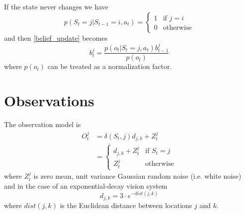 If the state never changes we have
\begin{equation}\label{fixed_target}
  p(S_t = j | S_{t-1} = i, a_t) =
  \begin{cases}
    1 & \text{if $j = i$} \\
    0 & \text{otherwise}
  \end{cases}
\end{equation}
and then \eqref{belief_update} becomes
\begin{equation}\label{belief_update_fixed}
  b_t^j = \frac{ p(o_t | S_t = j, a_t) b_{t-1}^j }{ p(o_t) }
\end{equation}
where $p(o_t)$ can be treated as a normalization factor.

\section{Observations}
The observation model is
\begin{equation}\label{app:ObservationModel}
  \begin{split}
    O_t^j &= \delta (S_t, j) d_{j,k} + Z_t^j \\
          &= \begin{cases}
                d_{j,k} + Z_t^j & \text{if $S_t = j$}\\
                Z_t^j           & \text{otherwise}
             \end{cases}
  \end{split}
\end{equation}
where $Z_t^j$ is zero mean, unit variance Gaussian random noise (i.e. white noise) and in the case of an exponential-decay vision system 
\begin{equation}
  d_{j,k} = 3 \cdot e^{-dist(j,k)}
\end{equation}
where $dist(j,k)$ is the Euclidean distance between locations $j$ and $k$.

